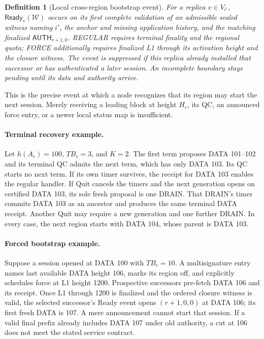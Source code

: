 \documentclass[11pt,a4paper]{article}
\newcommand{\tagg}[1]{\ensuremath{\mathsf{#1}}}
\newtheorem{definition}{Definition}[section]
\begin{document}
\begin{definition}[Local cross-region bootstrap event]
\label{def:bootstrap}
For a replica $v\in V_{i'}$, $\tagg{Ready}_v(\mathcal W)$ occurs on its
first complete validation of an admissible sealed witness naming $i'$,
the anchor and missing application history, and the matching finalized
$\tagg{AUTH}_{r+1,0}$. REGULAR requires terminal finality and the regional
quota; FORCE additionally requires finalized L1 through its activation
height and the closure witness. The event is suppressed if this replica
already installed that successor or has authenticated a later session.
An incomplete boundary stays pending until its data and authority arrive.
\end{definition}
This is the precise event at which a node recognizes that its region may
start the next session. Merely receiving a leading block at height $H_r$,
its QC, an announced force entry, or a newer local status map is insufficient.

\paragraph{Terminal recovery example.}
Let $h(A_r)=100$, $TB_r=3$, and $K=2$. The first term proposes DATA
101--102 and its terminal QC admits the next term, which has only DATA
103. Its QC starts no next term. If its own timer survives, the receipt
for DATA 103 enables the regular handler. If Quit cancels the timers and
the next generation opens on certified DATA 103, its sole fresh proposal
is one DRAIN. That DRAIN's timer commits DATA 103 as an ancestor and
produces the same terminal DATA receipt. Another Quit may require a new
generation and one further DRAIN. In every case, the next region starts
with DATA 104, whose parent is DATA 103.

\paragraph{Forced bootstrap example.}
Suppose a session opened at DATA 100 with $TB_r=10$. A multisignature
entry names last available DATA height 106, marks its region off, and
explicitly schedules force at L1 height 1200. Prospective successors
pre-fetch DATA 106 and its receipt. Once L1 through 1200 is finalized and
the ordered closure witness is valid, the selected successor's Ready
event opens $(r+1,0,0)$ at DATA 106; its first fresh DATA is 107.
A mere announcement cannot start that session. If a valid final prefix
already includes DATA 107 under old authority, a cut at 106 does not meet
the stated service contract.
\end{document}
